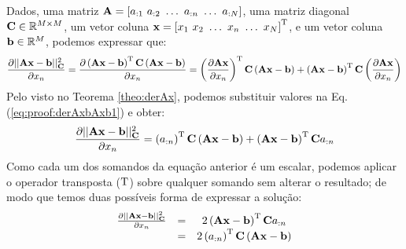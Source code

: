 \begin{myproofT}\label{proof:theo:derAxbAxb}
Dados,
uma matriz $\MATRIX{A}=\left[a_{:1}~ a_{:2}~ \hdots~ a_{:n}~ \hdots~ a_{:N}\right]$, 
uma matriz diagonal $\MATRIX{C}\in \mathbb{R}^{M\times M}$, 
um vetor coluna $\VECTOR{x}=\left[x_{1}~ x_{2}~ \hdots~ x_{n}~ \hdots~ x_{N}\right]^{\transpose}$, e 
um vetor coluna $\VECTOR{b}\in \mathbb{R}^{M}$, 
podemos expressar que:
\begin{equation}\label{eq:proof:derAxbAxb1}
\frac{\partial ||\MATRIX{A}\VECTOR{x}-\VECTOR{b}||_{\MATRIX{C}}^2}{\partial x_n} =
\frac{\partial \left(\MATRIX{A}\VECTOR{x}-\VECTOR{b}\right)^{\transpose}\MATRIX{C}\left(\MATRIX{A}\VECTOR{x}-\VECTOR{b}\right)}{\partial x_n}=
 \left(\frac{\partial\MATRIX{A}\VECTOR{x}}{\partial x_n}\right)^{\transpose}\MATRIX{C}\left(\MATRIX{A}\VECTOR{x}-\VECTOR{b}\right)+
 \left(\MATRIX{A}\VECTOR{x}-\VECTOR{b}\right)^{\transpose}\MATRIX{C}\left(\frac{\partial\MATRIX{A}\VECTOR{x}}{\partial x_n}\right)
\end{equation}
Pelo visto no Teorema \ref{theo:derAx}, podemos substituir valores na Eq. (\ref{eq:proof:derAxbAxb1})
e obter:
\begin{equation}\label{eq:proof:derAxbAxb2}
\frac{\partial ||\MATRIX{A}\VECTOR{x}-\VECTOR{b}||_{\MATRIX{C}}^{2}}{\partial x_n}=
\left(a_{:n}\right)^{\transpose}\MATRIX{C}\left( \MATRIX{A}\VECTOR{x}-\VECTOR{b}\right) +
\left(\MATRIX{A}\VECTOR{x}-\VECTOR{b}\right)^{\transpose}\MATRIX{C} a_{:n}
\end{equation}
Como cada um dos somandos da equação anterior é um escalar, podemos aplicar o operador
transposta ($\mathrm{T}$) sobre qualquer somando sem alterar o resultado; de modo que temos duas possíveis
forma de expressar a solução:
\begin{equation}
\begin{matrix}
\frac{\partial ||\MATRIX{A}\VECTOR{x}-\VECTOR{b}||_{\MATRIX{C}}^2 }{\partial x_n}&=&
2\left(\MATRIX{A}\VECTOR{x}-\VECTOR{b}\right)^{\transpose}\MATRIX{C}a_{:n}\\
~&=& 2\left(a_{:n}\right)^{\transpose}\MATRIX{C}\left(\MATRIX{A}\VECTOR{x}-\VECTOR{b}\right)
\end{matrix}
\end{equation}
\end{myproofT}

